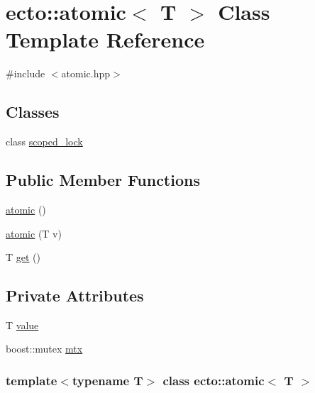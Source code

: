 \hypertarget{classecto_1_1atomic}{\section{ecto\-:\-:atomic$<$ \-T $>$ \-Class \-Template \-Reference}
\label{classecto_1_1atomic}
}


{\ttfamily \#include $<$atomic.\-hpp$>$}

\subsection*{\-Classes}
\begin{DoxyCompactItemize}
\item 
class \hyperlink{classecto_1_1atomic_1_1scoped__lock}{scoped\-\_\-lock}
\end{DoxyCompactItemize}
\subsection*{\-Public \-Member \-Functions}
\begin{DoxyCompactItemize}
\item 
\hyperlink{classecto_1_1atomic_ab905c76c87a64092b9c4217c6cc2b00d}{atomic} ()
\item 
\hyperlink{classecto_1_1atomic_a805df2159911558f653edbe19a789b51}{atomic} (\-T v)
\item 
\-T \hyperlink{classecto_1_1atomic_aa98175bf31ad55fe61e5d3d324a4f664}{get} ()
\end{DoxyCompactItemize}
\subsection*{\-Private \-Attributes}
\begin{DoxyCompactItemize}
\item 
\-T \hyperlink{classecto_1_1atomic_ac5ba45af623c7bc47e6918e290e39c67}{value}
\item 
boost\-::mutex \hyperlink{classecto_1_1atomic_a52a121e21f9449371998dbccaca0cbde}{mtx}
\end{DoxyCompactItemize}
\subsubsection*{template$<$typename T$>$ class ecto\-::atomic$<$ T $>$}



